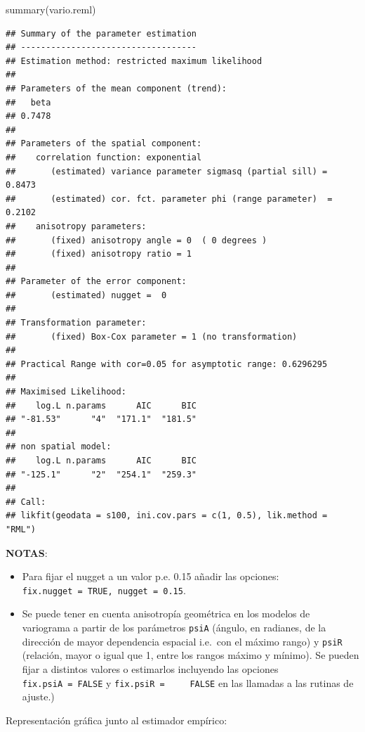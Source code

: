 \documentclass[
  spanish,
]{book}
\newenvironment{Shaded}{\begin{snugshade}}{\end{snugshade}}
\newcommand{\FunctionTok}[1]{\textcolor[rgb]{0.00,0.00,0.00}{#1}}
\newcommand{\NormalTok}[1]{#1}
\theoremstyle{break}
\begin{document}
\begin{Shaded}
\begin{Highlighting}[]
\FunctionTok{summary}\NormalTok{(vario.reml)}
\end{Highlighting}
\end{Shaded}

\begin{verbatim}
## Summary of the parameter estimation
## -----------------------------------
## Estimation method: restricted maximum likelihood 
## 
## Parameters of the mean component (trend):
##   beta 
## 0.7478 
## 
## Parameters of the spatial component:
##    correlation function: exponential
##       (estimated) variance parameter sigmasq (partial sill) =  0.8473
##       (estimated) cor. fct. parameter phi (range parameter)  =  0.2102
##    anisotropy parameters:
##       (fixed) anisotropy angle = 0  ( 0 degrees )
##       (fixed) anisotropy ratio = 1
## 
## Parameter of the error component:
##       (estimated) nugget =  0
## 
## Transformation parameter:
##       (fixed) Box-Cox parameter = 1 (no transformation)
## 
## Practical Range with cor=0.05 for asymptotic range: 0.6296295
## 
## Maximised Likelihood:
##    log.L n.params      AIC      BIC 
## "-81.53"      "4"  "171.1"  "181.5" 
## 
## non spatial model:
##    log.L n.params      AIC      BIC 
## "-125.1"      "2"  "254.1"  "259.3" 
## 
## Call:
## likfit(geodata = s100, ini.cov.pars = c(1, 0.5), lik.method = "RML")
\end{verbatim}

\textbf{NOTAS}:

\begin{itemize}
\item
  Para fijar el nugget a un valor p.e. 0.15 añadir las opciones:
  \texttt{fix.nugget\ =\ TRUE,\ nugget\ =\ 0.15}.
\item
  Se puede tener en cuenta anisotropía geométrica en los modelos de
  variograma a partir de los parámetros \texttt{psiA} (ángulo, en radianes,
  de la dirección de mayor dependencia espacial i.e.~con el
  máximo rango) y \texttt{psiR} (relación, mayor o igual que 1, entre los
  rangos máximo y mínimo). Se pueden fijar a distintos valores o
  estimarlos incluyendo las opciones \texttt{fix.psiA\ =\ FALSE} y \texttt{fix.psiR\ =\ \ \ \ \ FALSE} en las llamadas a las rutinas de ajuste.)
\end{itemize}

Representación gráfica junto al estimador empírico:
\end{document}
